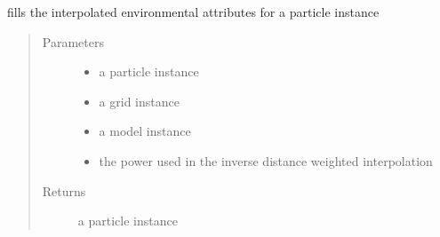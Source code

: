 \documentclass[letterpaper,10pt,english]{sphinxmanual}
\begin{document}
\begin{fulllineitems}
\label{\detokenize{octapy:octapy.tracking.interp3d}}
\sphinxAtStartPar
fills the interpolated environmental attributes for a particle instance
\begin{quote}\begin{description}
\item[{Parameters}] \leavevmode\begin{itemize}
\item {} 
\sphinxAtStartPar
{} \textendash{} a particle instance

\item {} 
\sphinxAtStartPar
{} \textendash{} a grid instance

\item {} 
\sphinxAtStartPar
{} \textendash{} a model instance

\item {} 
\sphinxAtStartPar
{} \textendash{} the power used in the inverse distance weighted interpolation

\end{itemize}

\item[{Returns}] \leavevmode
\sphinxAtStartPar
a particle instance

\end{description}\end{quote}

\end{fulllineitems}

\end{document}
